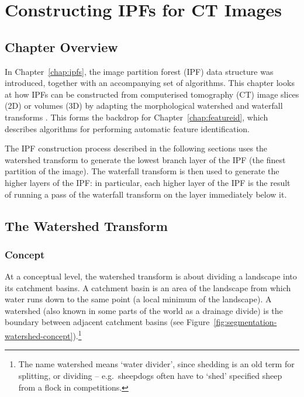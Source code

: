 \chapter{Constructing IPFs for CT Images}
\label{chap:segmentation}

\section{Chapter Overview}

In Chapter~\ref{chap:ipfs}, the image partition forest (IPF) data structure was introduced, together with an accompanying set of algorithms. This chapter looks at how IPFs can be constructed from computerised tomography (CT) image slices (2D) or volumes (3D) by adapting the morphological watershed and waterfall transforms \cite{beucher94,marcotegui05}. This forms the backdrop for Chapter~\ref{chap:featureid}, which describes algorithms for performing automatic feature identification.

The IPF construction process described in the following sections uses the watershed transform to generate the lowest branch layer of the IPF (the finest partition of the image). The waterfall transform is then used to generate the higher layers of the IPF: in particular, each higher layer of the IPF is the result of running a pass of the waterfall transform on the layer immediately below it.

\section{The Watershed Transform}

\subsection{Concept}

At a conceptual level, the watershed transform is about dividing a landscape into its catchment basins. A catchment basin is an area of the landscape from which water runs down to the same point (a local minimum of the landscape). A watershed (also known in some parts of the world as a drainage divide) is the boundary between adjacent catchment basins (see Figure~\ref{fig:segmentation-watershed-concept}).\footnote{The name watershed means `water divider', since shedding is an old term for splitting, or dividing -- e.g.~sheepdogs often have to `shed' specified sheep from a flock in competitions.}

